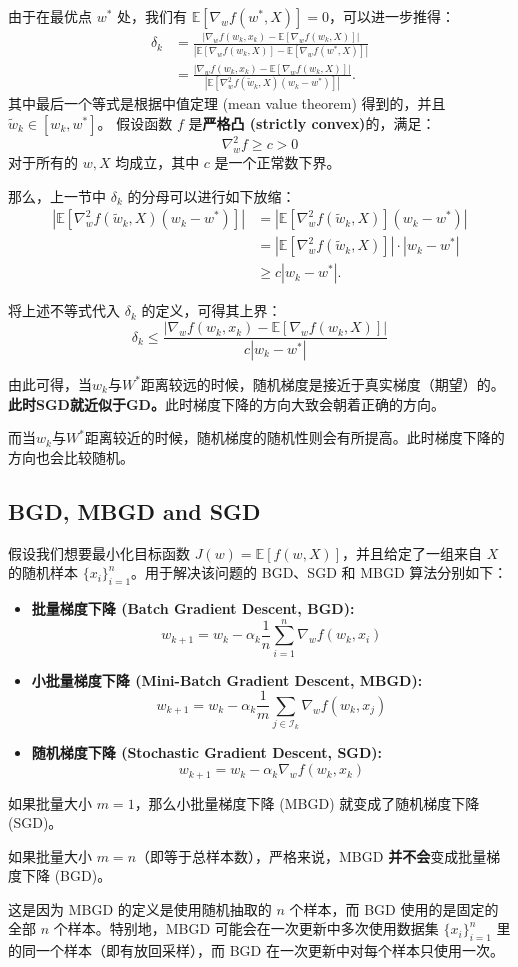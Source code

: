 \documentclass{article}
\begin{document}
由于在最优点 $w^*$ 处，我们有 $\mathbb{E}[\nabla_w f(w^*, X)] = 0$，可以进一步推得：
\begin{align*}
\delta_k &= \frac{|\nabla_w f(w_k, x_k) - \mathbb{E}[\nabla_w f(w_k, X)]|}{|\mathbb{E}[\nabla_w f(w_k, X)] - \mathbb{E}[\nabla_w f(w^*, X)]|} \\
&= \frac{|\nabla_w f(w_k, x_k) - \mathbb{E}[\nabla_w f(w_k, X)]|}{|\mathbb{E}[\nabla_w^2 f(\tilde{w}_k, X)(w_k - w^*)]|}.
\end{align*}
其中最后一个等式是根据中值定理 (mean value theorem) 得到的，并且 $\tilde{w}_k \in [w_k, w^*]$。
假设函数 $f$ 是\textbf{严格凸 (strictly convex)}的，满足：
\[
\nabla_w^2 f \ge c > 0
\]
对于所有的 $w, X$ 均成立，其中 $c$ 是一个正常数下界。

那么，上一节中 $\delta_k$ 的分母可以进行如下放缩：
\begin{align*}
    \left|\mathbb{E}[\nabla_w^2 f(\tilde{w}_k, X)(w_k - w^*)]\right| &= \left|\mathbb{E}[\nabla_w^2 f(\tilde{w}_k, X)](w_k - w^*)\right| \\
    &= \left|\mathbb{E}[\nabla_w^2 f(\tilde{w}_k, X)]\right| \cdot |w_k - w^*| \\
    &\ge c|w_k - w^*|.
\end{align*}

将上述不等式代入 $\delta_k$ 的定义，可得其上界：
\[
\delta_k \le \frac{|\nabla_w f(w_k, x_k) - \mathbb{E}[\nabla_w f(w_k, X)]|}{c|w_k - w^*|}
\]

由此可得，当$w_k$与$W^*$距离较远的时候，随机梯度是接近于真实梯度（期望）的。\textbf{此时SGD就近似于GD。}此时梯度下降的方向大致会朝着正确的方向。

而当$w_k$与$W^*$距离较近的时候，随机梯度的随机性则会有所提高。此时梯度下降的方向也会比较随机。
\subsection{BGD, MBGD and SGD}
假设我们想要最小化目标函数 $J(w) = \mathbb{E}[f(w, X)]$，并且给定了一组来自 $X$ 的随机样本 $\{x_i\}_{i=1}^n$。用于解决该问题的 BGD、SGD 和 MBGD 算法分别如下：

\begin{itemize}
    \item \textbf{批量梯度下降 (Batch Gradient Descent, BGD):}
    \[
    w_{k+1} = w_k - \alpha_k \frac{1}{n} \sum_{i=1}^{n} \nabla_w f(w_k, x_i)
    \]
    
    \item \textbf{小批量梯度下降 (Mini-Batch Gradient Descent, MBGD):}
    \[
    w_{k+1} = w_k - \alpha_k \frac{1}{m} \sum_{j \in \mathcal{I}_k} \nabla_w f(w_k, x_j)
    \]
    
    \item \textbf{随机梯度下降 (Stochastic Gradient Descent, SGD):}
    \[
    w_{k+1} = w_k - \alpha_k \nabla_w f(w_k, x_k)
    \]
\end{itemize}

如果批量大小 $m = 1$，那么小批量梯度下降 (MBGD) 就变成了随机梯度下降 (SGD)。
    
如果批量大小 $m = n$（即等于总样本数），严格来说，MBGD \textbf{并不会}变成批量梯度下降 (BGD)。
    
这是因为 MBGD 的定义是使用随机抽取的 $n$ 个样本，而 BGD 使用的是固定的全部 $n$ 个样本。特别地，MBGD 可能会在一次更新中多次使用数据集 $\{x_i\}_{i=1}^n$ 里的同一个样本（即有放回采样），而 BGD 在一次更新中对每个样本只使用一次。
    
\end{document}
